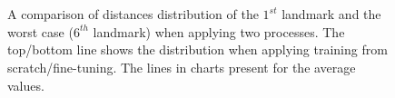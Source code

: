 \documentclass[review]{elsarticle}
\begin{document}
\begin{figure}[htbp]
    \centering
    ~~
    \\
    ~~
    \caption{A comparison of distances distribution of the $1^{st}$ landmark and the worst case ($6^{th}$ landmark) when applying two processes. The top/bottom line shows the distribution when applying training from scratch/fine-tuning.  The lines in charts present for the average values.}
    \label{figchartfn}
\end{figure}
\end{document}

